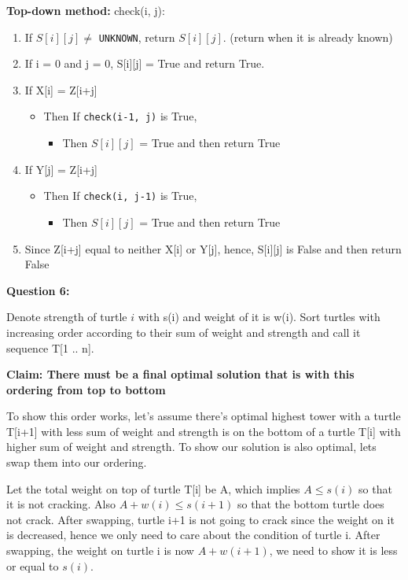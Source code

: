 \documentclass{article}
\begin{document}
\textbf{Top-down method:}\newline
check(i, j):
\begin{enumerate}
\item If $S[i][j] \neq$ \texttt{UNKNOWN}, return $S[i][j]$. (return when it is already known)
\item If i = 0 and j = 0, S[i][j] = True and return True.

\item If X[i] = Z[i+j]
  \begin{itemize}
  \item Then If \texttt{check(i-1, j)} is True,
    \begin{itemize}
    \item Then $S[i][j]$ = True and then return True
    \end{itemize}
  \end{itemize}

\item If Y[j] = Z[i+j]
  \begin{itemize}
  \item Then If \texttt{check(i, j-1)} is True,
    \begin{itemize}
    \item Then $S[i][j]$ = True and then return True
    \end{itemize}
  \end{itemize}

\item Since Z[i+j] equal to neither X[i] or Y[j], hence, S[i][j] is False and then return False
\end{enumerate}

\textbf{Question 6:\newline}

Denote strength of turtle $i$ with s(i) and weight of it is w(i). Sort turtles with increasing order according to their sum of weight and strength and call it sequence T[1 .. n].\newline

\textbf{Claim: There must be a final optimal solution that is with this ordering from top to bottom}\newline

To show this order works, let's assume there's optimal highest tower with a turtle T[i+1] with less sum of weight and strength is on the bottom of a turtle T[i] with higher sum of weight and strength. To show our solution is also optimal, lets swap them into our ordering.

Let the total weight on top of turtle T[i] be A, which implies $A \leq s(i)$ so that it is not cracking. Also $A + w(i) \leq s(i+1)$ so that the bottom turtle does not crack. After swapping, turtle i+1 is not going to crack since the weight on it is decreased, hence we only need to care about the condition of turtle i. After swapping, the weight on turtle i is now $A + w(i+1)$, we need to show it is less or equal to $s(i)$.
\end{document}
